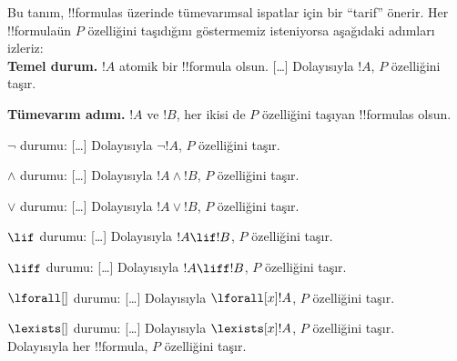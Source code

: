 \documentclass[../../../include/open-logic-section]{subfiles}
\begin{document}
\begin{explain}
Bu tanım, !!{formula}s üzerinde tümevarımsal ispatlar için bir ``tarif''
önerir. Her !!{formula}{}ün $P$ özelliğini taşıdığını göstermemiz isteniyorsa
aşağıdaki adımları izleriz:\\

\textbf{Temel durum.} $!A$ atomik bir !!{formula} olsun. [\ldots]
Dolayısıyla $!A$, $P$ özelliğini taşır.

\textbf{Tümevarım adımı.} $!A$ ve $!B$, her ikisi de $P$ özelliğini taşıyan
!!{formula}s olsun.

$\lnot$ durumu: [\ldots] Dolayısıyla $\lnot !A$, $P$ özelliğini taşır.

$\land$ durumu: [\ldots] Dolayısıyla $!A \land !B$, $P$ özelliğini taşır.

$\lor$ durumu: [\ldots] Dolayısıyla $!A \lor !B$, $P$ özelliğini taşır.

$\lif$ durumu: [\ldots] Dolayısıyla $!A \lif !B$, $P$ özelliğini taşır.

$\liff$ durumu: [\ldots] Dolayısıyla $!A \liff !B$, $P$ özelliğini taşır.

$\lforall[]$ durumu: [\ldots] Dolayısıyla $\lforall[x] !A$, $P$ özelliğini taşır.

$\lexists[]$ durumu: [\ldots] Dolayısıyla $\lexists[x] !A$, $P$ özelliğini taşır. \\

Dolayısıyla her !!{formula}, $P$ özelliğini taşır.
\end{explain}
\end{document}
